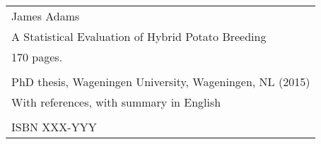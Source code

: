 \newpage
\thispagestyle{empty}
\vspace*{\fill}
\begin{flushleft}
\begin{tabular}{l}
    James Adams                                              \\  
    A Statistical Evaluation of Hybrid Potato Breeding       \\  
    170 pages.                                               \\  
                                                             \\  
    PhD thesis, Wageningen University, Wageningen, NL (2015) \\  
    With references, with summary in English                 \\  
                                                             \\  
    ISBN XXX-YYY                                             \\  
\end{tabular}
\end{flushleft}
